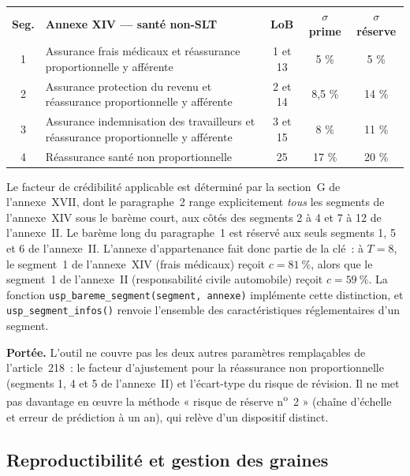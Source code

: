 \documentclass[a4paper,11pt]{article}
\newcommand{\code}[1]{\texttt{\small #1}}
\begin{document}
\begin{center}
\small
{}
\begin{tabular}{@{}cp{8.0cm}ccc@{}}
\rowcolor{tableheader}
\textcolor{financeblue}{\textbf{Seg.}} &
\textcolor{financeblue}{\textbf{Annexe XIV --- santé non-SLT}} &
\textcolor{financeblue}{\textbf{LoB}} &
\textcolor{financeblue}{\textbf{$\sigma$ prime}} &
\textcolor{financeblue}{\textbf{$\sigma$ réserve}} \\
1 & Assurance frais médicaux et réassurance proportionnelle y afférente & 1 et 13 & 5 \% & 5 \% \\
2 & Assurance protection du revenu et réassurance proportionnelle y afférente & 2 et 14 & 8,5 \% & 14 \% \\
3 & Assurance indemnisation des travailleurs et réassurance proportionnelle y afférente & 3 et 15 & 8 \% & 11 \% \\
4 & Réassurance santé non proportionnelle & 25 & 17 \% & 20 \% \\
\end{tabular}
\end{center}

\noindent
Le facteur de crédibilité applicable est déterminé par la section~G de
l'annexe~XVII, dont le paragraphe~2 range explicitement \emph{tous} les segments
de l'annexe~XIV sous le barème court, aux côtés des segments 2 à 4 et 7 à 12 de
l'annexe~II. Le barème long du paragraphe~1 est réservé aux seuls segments 1, 5
et 6 de l'annexe~II. L'annexe d'appartenance fait donc partie de la clé~: à
$T = 8$, le segment~1 de l'annexe~XIV (frais médicaux) reçoit $c = 81~\%$, alors
que le segment~1 de l'annexe~II (responsabilité civile automobile) reçoit
$c = 59~\%$. La fonction \code{usp\_bareme\_segment(segment, annexe)} implémente
cette distinction, et \code{usp\_segment\_infos()} renvoie l'ensemble des
caractéristiques réglementaires d'un segment.

\begin{encadre}
\textbf{Portée.} L'outil ne couvre pas les deux autres paramètres remplaçables
de l'article~218~: le facteur d'ajustement pour la réassurance non
proportionnelle (segments 1, 4 et 5 de l'annexe~II) et l'écart-type du risque de
révision. Il ne met pas davantage en \oe uvre la méthode « risque de réserve
n\textsuperscript{o}~2 » (chaîne d'échelle et erreur de prédiction à un an), qui
relève d'un dispositif distinct.
\end{encadre}

\subsection{Reproductibilité et gestion des graines}
\end{document}
